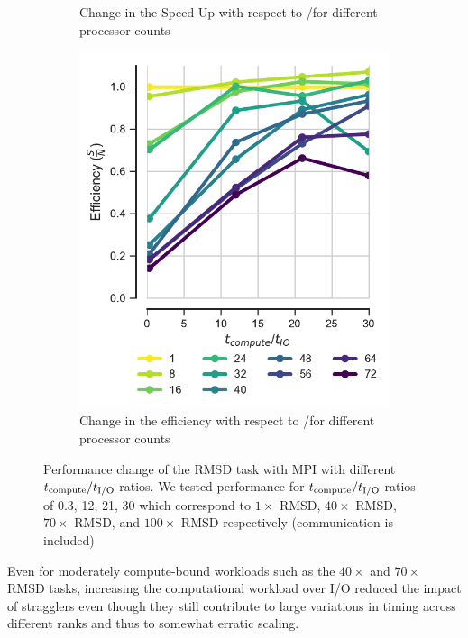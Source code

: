 \begin{figure}
\begin{subfigure}{.3\textwidth}
  \caption{Change in the Speed-Up with respect to \tcomp/\tIO for different processor counts}
  \label{fig:S2_tcomp_tIO_effect}
\end{subfigure}
\hfill
\begin{subfigure}{.3\textwidth}
  \includegraphics[width=\linewidth]{figures/Compute_to_IO_ratio_on_performance_2d_3_v17.pdf}
  \caption{Change in the efficiency with respect to \tcomp/\tIO for different processor counts}
  \label{fig:E_tcomp_tIO_effect}
\end{subfigure}
%
\caption{Performance change of the RMSD task with MPI with different ${t}_{\text{compute}}/{t}_{\text{I/O}}$ ratios. We tested performance for ${t}_{\text{compute}}/{t}_{\text{I/O}}$ ratios of 0.3, 12, 21, 30
which correspond to $1\times$ RMSD, $40\times$ RMSD, $70\times$ RMSD, and $100\times$ RMSD respectively (communication is included)}
\label{fig:tcomp_tIO_effect}
\end{figure}

Even for moderately compute-bound workloads such
as the $40\times$ and $70\times$ RMSD tasks, increasing the computational workload over I/O reduced the impact of stragglers even
though they still contribute to large variations in timing across different ranks and thus to somewhat erratic scaling. 

